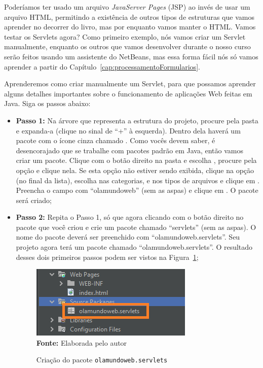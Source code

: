 Poderíamos ter usado um arquivo \textit{JavaServer Pages} (JSP) ao invés de usar um arquivo HTML, permitindo a existência de outros tipos de estruturas que vamos aprender no decorrer do livro, mas por enquanto vamos manter o HTML. Vamos testar os Servlets agora? Como primeiro exemplo, nós vamos criar um Servlet manualmente, enquanto os outros que vamos desenvolver durante o nosso curso serão feitos usando um assistente do NetBeans, mas essa forma fácil nós só vamos aprender a partir do Capítulo~\ref{cap:processamentoFormularios}.

Aprenderemos como criar manualmente um Servlet, para que possamos aprender alguns detalhes importantes sobre o funcionamento de aplicações Web feitas em Java. Siga os passos abaixo:

\begin{itemize}
    
    \item \textbf{Passo 1:} Na árvore que representa a estrutura do projeto, procure pela pasta  e expanda-a (clique no sinal de ``+'' à esquerda). Dentro dela haverá um pacote com o ícone cinza chamado . Como vocês devem saber, é desencorajado que se trabalhe com pacotes padrão em Java, então vamos criar um pacote. Clique com o botão direito na pasta  e escolha , procure pela opção  e clique nela. Se esta opção não estiver sendo exibida, clique na opção  (no final da lista), escolha  nas categorias, e  nos tipos de arquivos e clique em . Preencha o campo  com ``olamundoweb'' (sem as aspas) e clique em . O pacote será criado;
        
    \item \textbf{Passo 2:} Repita o Passo 1, só que agora clicando com o botão direito no pacote que você criou e crie um pacote chamado ``servlets'' (sem as aspas). O nome do pacote deverá ser preenchido com ``olamundoweb.servlets''. Seu projeto agora terá um pacote chamado ``olamundoweb.servlets''. O resultado desses dois primeiros passos podem ser vistos na Figura~\ref{fig:cap01CriacaoPacote};
    
    \FloatBarrier
    \begin{figure}[!htbp]
        \centering
        \caption{Criação do pacote \texttt{olamundoweb.servlets}}
        \includegraphics[scale=0.9]{imagens/cap01CriacaoPacote}
        \\\textbf{Fonte:} Elaborada pelo autor
        \label{fig:cap01CriacaoPacote}
    \end{figure}
    \FloatBarrier
            

\end{itemize}
